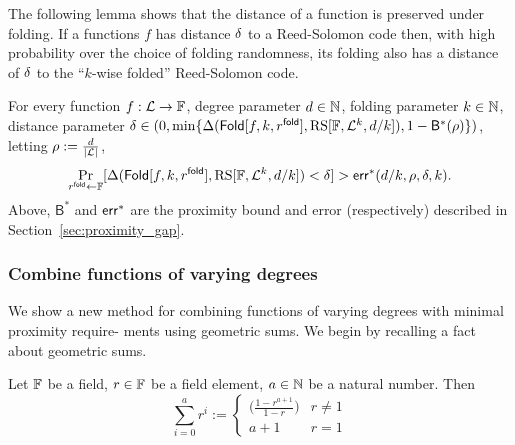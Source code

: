 The following lemma shows that the distance of a function is preserved under folding. If a functions $f$ has distance $\delta$ to a Reed-Solomon code then, with high probability over the choice of folding randomness, its folding also has a distance of $\delta$ to the ``$k$-wise folded'' Reed-Solomon code.

\begin{lemma}\label{lemma:folding}
    For every function $f:\mathcal{L}\rightarrow\mathbb{F}$, degree parameter $d\in\mathbb{N}$, folding parameter $k\in\mathbb{N}$, distance parameter $\delta\in(0,\min\{{\Delta(\mathsf{Fold}[f,k,r^{\mathsf{fold}}],\mathrm{RS}[\mathbb{F},{\mathcal{L}}^k, d/k]),1-{\mathsf{B}}^*(\rho)}\})$, letting $\rho:=\frac{d}{|\mathcal{L}|}$,
    \[
        \Pr_{r^{\mathsf{fold}}\gets\mathbb{F}}[\Delta(\mathsf{Fold}[f,k,r^{\mathsf{fold}}],\mathrm{RS}[\mathbb{F},{\mathcal{L}}^k, d/k])<\delta]>\mathsf{err}^*(d/k,\rho,\delta,k).
    \]
    Above, ${\mathsf{B}}^*$ and ${\mathsf{err}}^*$ are the proximity bound and error (respectively) described in Section~\ref{sec:proximity_gap}.
\end{lemma}

\subsubsection{Combine functions of varying degrees}\label{sec:combine}
We show a new method for combining functions of varying degrees with minimal proximity require- ments using geometric sums. We begin by recalling a fact about geometric sums.

\begin{lemma}\label{fact:geometric_sum}
    Let $\mathbb{F}$ be a field, $r\in\mathbb{F}$ be a field element, $a\in\mathbb{N}$ be a natural number. Then
    \[
        \sum_{i=0}^{a}r^i:=
        \begin{cases}
        \Big(\frac{1-r^{a+1}}{1-r}\Big) & r\neq 1 \\
        a+1 & r=1
        \end{cases}
    \]
\end{lemma}

